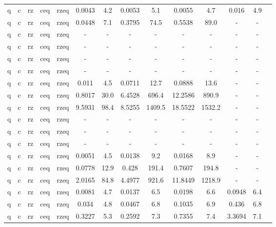\begin{table}[htb]
{\begin{tabular}{|c|c|c|c|c|c|c|c|c|c|c|c|c|c|}
q & c & rz & ceq & rzeq & 0.0043 & 4.2 & 0.0053 & 5.1 & 0.0055 & 4.7 & 0.016 & 4.9 \\ 
q & c & rz & ceq & rzeq & 0.0448 & 7.1 & 0.3795 & 74.5 & 0.5538 & 89.0 & - & - \\ 
q & c & rz & ceq & rzeq & - & - & - & - & - & - & - & - \\ 
q & c & rz & ceq & rzeq & - & - & - & - & - & - & - & - \\ 
q & c & rz & ceq & rzeq & - & - & - & - & - & - & - & - \\ 
q & c & rz & ceq & rzeq & - & - & - & - & - & - & - & - \\ 
q & c & rz & ceq & rzeq & 0.011 & 4.5 & 0.0711 & 12.7 & 0.0888 & 13.6 & - & - \\ 
q & c & rz & ceq & rzeq & 0.8017 & 30.0 & 6.4528 & 696.4 & 12.2586 & 890.9 & - & - \\ 
q & c & rz & ceq & rzeq & 9.5931 & 98.4 & 8.5255 & 1409.5 & 18.5522 & 1532.2 & - & - \\ 
q & c & rz & ceq & rzeq & - & - & - & - & - & - & - & - \\ 
q & c & rz & ceq & rzeq & - & - & - & - & - & - & - & - \\ 
q & c & rz & ceq & rzeq & - & - & - & - & - & - & - & - \\ 
q & c & rz & ceq & rzeq & 0.0051 & 4.5 & 0.0138 & 9.2 & 0.0168 & 8.9 & - & - \\ 
q & c & rz & ceq & rzeq & 0.0778 & 12.9 & 0.428 & 191.4 & 0.7607 & 194.8 & - & - \\ 
q & c & rz & ceq & rzeq & 2.0165 & 84.8 & 4.4977 & 921.6 & 11.8449 & 1218.9 & - & - \\ 
q & c & rz & ceq & rzeq & 0.0081 & 4.7 & 0.0137 & 6.5 & 0.0198 & 6.6 & 0.0948 & 6.4 \\ 
q & c & rz & ceq & rzeq & 0.034 & 4.8 & 0.0467 & 6.8 & 0.1035 & 6.9 & 0.436 & 6.8 \\ 
q & c & rz & ceq & rzeq & 0.3227 & 5.3 & 0.2592 & 7.3 & 0.7355 & 7.4 & 3.3694 & 7.1 \\ 
\hline 
\end{tabular}} 
\end{table} 
